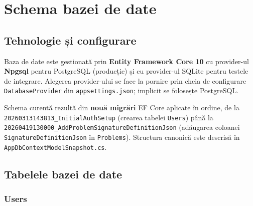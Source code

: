 
\section{Schema bazei de date}
\label{sec:schema_bd}

\subsection{Tehnologie și configurare}

Baza de date este gestionată prin \textbf{Entity Framework Core 10} cu
provider-ul \textbf{Npgsql} pentru PostgreSQL (producție) și cu provider-ul
SQLite pentru testele de integrare. Alegerea provider-ului se face la
pornire prin cheia de configurare \texttt{DatabaseProvider} din
\texttt{appsettings.json}; implicit se folosește PostgreSQL.

Schema curentă rezultă din \textbf{nouă migrări} EF Core aplicate în ordine,
de la \texttt{20260313143813\_InitialAuthSetup} (crearea tabelei \texttt{Users})
până la \texttt{20260419130000\_AddProblemSignatureDefinitionJson}
(adăugarea coloanei \texttt{SignatureDefinitionJson} în \texttt{Problems}).
Structura canonică este descrisă în
\texttt{AppDbContextModelSnapshot.cs}.

\subsection{Tabelele bazei de date}

\subsubsection{Users}

